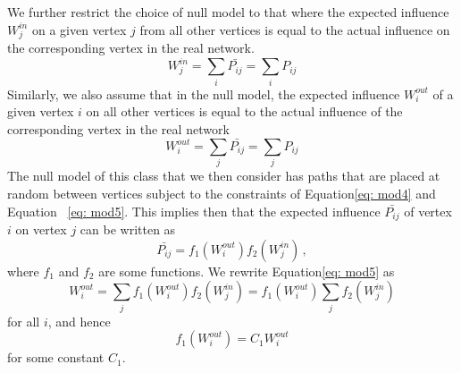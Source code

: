 \documentclass{sig-alternate}
\begin{document}
We further restrict the choice of null model to that where the expected  influence $W_j^{in}$ on a given vertex $j$ from all other vertices  is equal to the actual influence on the corresponding vertex in the real network.
\begin{equation}
\label{eq: mod4}
W_{j}^{in} = \sum_{i} \bar{P_{ij}} = \sum_{i} P_{ij}
\end{equation}
Similarly, we also assume that in the null model, the expected  influence $W_{i}^{out}$ of a given vertex $i$ on all other vertices  is equal to the actual influence of the corresponding vertex in the real network
\begin{equation}
\label{eq: mod5}
W_{i}^{out} = \sum_{j} \bar{P_{ij}} = \sum_{j} P_{ij}
\end{equation}
The null model of this class that we then consider has paths that are placed at random between vertices subject to the constraints  of Equation\eqref{eq: mod4} and  Equation ~\eqref{eq: mod5}.
This implies then that the expected influence $\bar{P_{ij}}$ of vertex $i$ on vertex $j$ can be written as
\begin{equation}
\label{eq: mod11}
\bar{P_{ij}} = f_1(W_{i}^{out})f_2(W_{j}^{in})\,,
\end{equation}
where $f_1$ and $f_2$ are some functions. We rewrite Equation\eqref{eq: mod5}  as
\begin{equation}
\label{eq: mod6}
W_{i}^{out} = \sum_{j}{ f_1(W_{i}^{out})f_2(W_{j}^{in})}= f_1(W_{i}^{out})\sum_{j}{f_2(W_{j}^{in})}
\end{equation}
for all $i$, and hence
\begin{equation}
\label{eq: mod12}
 f_1(W_{i}^{out}) = C_{1}{W_{i}^{out}}
\end{equation}
for some constant $C_1$.
\end{document}
